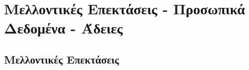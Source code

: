 
\chapter{Μελλοντικές Επεκτάσεις - Προσωπικά Δεδομένα - Άδειες} %

\label{Μελοντικές Επεκτάσεις - Προσωπικά Δεδομένα - Άδειες} %


\section{Μελλοντικές Επεκτάσεις}

